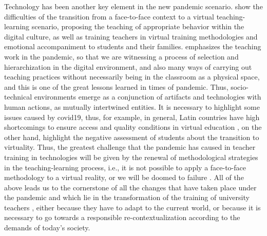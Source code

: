\documentclass{textolivre}
\begin{document}
Technology has been another key element in the new pandemic scenario. \textcite{talavera2020} %
show the difficulties of the transition from a face-to-face context to a virtual teaching-learning scenario, proposing the teaching of appropriate behavior within the digital culture, as well as training teachers in virtual training methodologies and emotional accompaniment to students and their families. \textcite{dussel2020} %
emphasizes the teaching work in the pandemic, so that we are witnessing a process of selection and hierarchization in the digital environment, and also many ways of carrying out teaching practices without necessarily being in the classroom as a physical space, and this is one of the great lessons learned in times of pandemic. Thus, socio-technical environments emerge as a conjunction of artifacts and technologies with human actions, as mutually intertwined entities. It is necessary to highlight some issues caused by covid19, thus, for example, in general, Latin countries have high shortcomings to ensure access and quality conditions in virtual education \textcite{sanchez2020}, %
on the other hand, \textcite{tejedor2020} %
highlight the negative assessment of students about the transition to virtuality. Thus, the greatest challenge that the pandemic has caused in teacher training in technologies will be given by the renewal of methodological strategies in the teaching-learning process, i.e., it is not possible to apply a face-to-face methodology to a virtual reality, or we will be doomed to failure \cite{talavera2020}. %
All of the above leads us to the cornerstone of all the changes that have taken place under the pandemic and which lie in the transformation of the training of university teachers \cite{suarez2020}, %
either because they have to adapt to the current world, or because it is necessary to go towards a responsible re-contextualization according to the demands of today's society.
\end{document}
